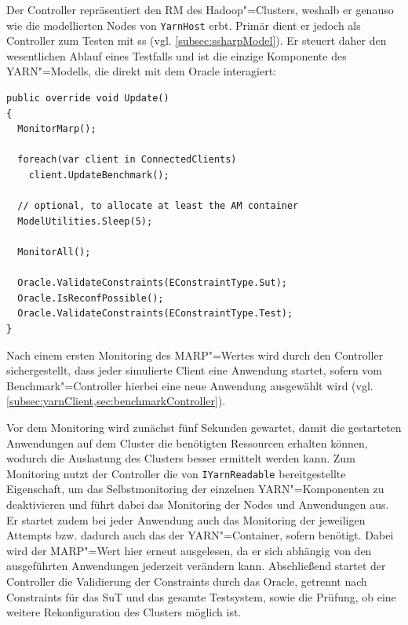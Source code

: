 Der Controller repräsentiert den \gls{RM} des Hadoop"=Clusters, weshalb er genauso wie die modellierten Nodes von \texttt{YarnHost} erbt.
Primär dient er jedoch als Controller zum Testen mit \gls{ss} (vgl. \cref{subsec:ssharpModel}).
Er steuert daher den wesentlichen Ablauf eines Testfalls und ist die einzige Komponente des YARN"=Modells, die direkt mit dem Oracle interagiert:

\begin{lstlisting}[label=lst:controllerUpdate,style=cs,
caption={[Update()"=Methode des Controllers]
    \texttt{Update()}"=Methode des Controllers (gekürzt).
    Eine ausführliche Beschreibung des gesamten Ablaufs eines Testfalls findet sich in \cref{subsec:simulationStep}.}]
public override void Update()
{
  MonitorMarp();
  
  foreach(var client in ConnectedClients)
    client.UpdateBenchmark();
  
  // optional, to allocate at least the AM container
  ModelUtilities.Sleep(5);
  
  MonitorAll();
  
  Oracle.ValidateConstraints(EConstraintType.Sut);
  Oracle.IsReconfPossible();
  Oracle.ValidateConstraints(EConstraintType.Test);
}
\end{lstlisting}

Nach einem ersten Monitoring des \gls{MARP}"=Wertes wird durch den Controller sichergestellt, dass jeder simulierte Client eine Anwendung startet, sofern vom Benchmark"=Controller hierbei eine neue Anwendung ausgewählt wird (vgl. \cref{subsec:yarnClient,sec:benchmarkController}).

Vor dem Monitoring wird zunächst fünf Sekunden gewartet, damit die gestarteten Anwendungen auf dem Cluster die benötigten Ressourcen erhalten können, wodurch die Auslastung des Clusters besser ermittelt werden kann.
Zum Monitoring nutzt der Controller die von \texttt{IYarnReadable} bereitgestellte Eigenschaft, um das Selbstmonitoring der einzelnen YARN"=Komponenten zu deaktivieren und führt dabei das Monitoring der Nodes und Anwendungen aus.
Er startet zudem bei jeder Anwendung auch das Monitoring der jeweiligen Attempts bzw. dadurch auch das der YARN"=Container, sofern benötigt.
Dabei wird der \gls{MARP}"=Wert hier erneut ausgelesen, da er sich abhängig von den ausgeführten Anwendungen jederzeit verändern kann.
Abschließend startet der Controller die Validierung der Constraints durch das Oracle, getrennt nach Constraints für das \gls{SuT} und das gesamte Testsystem, sowie die Prüfung, ob eine weitere Rekonfiguration des Clusters möglich ist.

